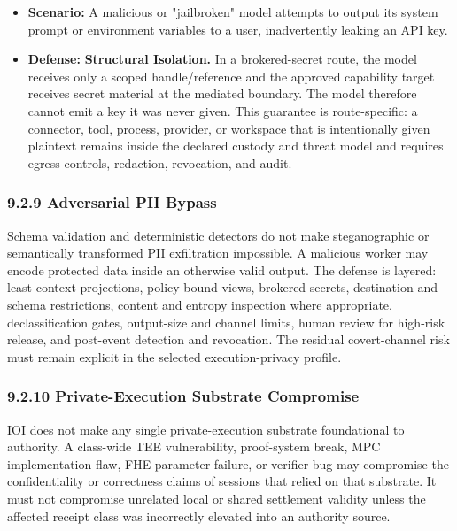 \documentclass[
  11pt,
]{article}
\providecommand{\tightlist}{%
  \setlength{\itemsep}{0pt}\setlength{\parskip}{0pt}}
\begin{document}
\begin{itemize}
\tightlist
\item
  \textbf{Scenario:} A malicious or "jailbroken" model attempts to
  output its system prompt or environment variables to a user,
  inadvertently leaking an API key.
\item
  \textbf{Defense:} \textbf{Structural Isolation. }In a brokered-secret
  route, the model receives only a scoped handle/reference and the approved
  capability target receives secret material at the mediated boundary. The
  model therefore cannot emit a key it was never given. This guarantee is
  route-specific: a connector, tool, process, provider, or workspace that is
  intentionally given plaintext remains inside the declared custody and
  threat model and requires egress controls, redaction, revocation, and audit.
\end{itemize}

\hypertarget{adversarial-pii-bypass}{%
\subsubsection{9.2.9 Adversarial PII
Bypass}\label{adversarial-pii-bypass}}

Schema validation and deterministic detectors do not make
steganographic or semantically transformed PII exfiltration impossible. A
malicious worker may encode protected data inside an otherwise valid output.
The defense is layered: least-context projections, policy-bound views,
brokered secrets, destination and schema restrictions, content and entropy
inspection where appropriate, declassification gates, output-size and
channel limits, human review for high-risk release, and post-event detection
and revocation. The residual covert-channel risk must remain explicit in the
selected execution-privacy profile.

\hypertarget{private-execution-substrate-compromise}{%
\subsubsection{9.2.10 Private-Execution Substrate
Compromise}\label{private-execution-substrate-compromise}}

IOI does not make any single private-execution substrate foundational to
authority. A class-wide TEE vulnerability, proof-system break, MPC
implementation flaw, FHE parameter failure, or verifier bug may
compromise the confidentiality or correctness claims of sessions that
relied on that substrate. It must not compromise unrelated local or shared
settlement validity unless the affected receipt class was incorrectly elevated into
an authority source.
\end{document}
